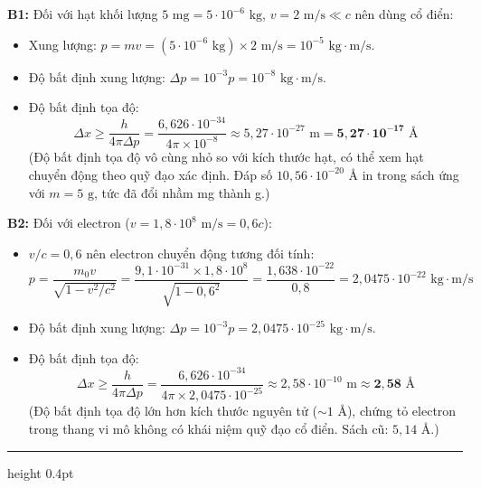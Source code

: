 \documentclass[11pt,a4paper]{article}
\renewcommand{\boldsymbol}[1]{\symbf{#1}}
\newcommand{\PhanCachBai}{%
  \par\Needspace{7\baselineskip}%
  \addvspace{6pt}%
  {\color{black!40}\hrule height 0.4pt}%
  \nobreak\vspace{7pt}\nobreak
}
\begin{document}
\textbf{B1:} Đối với hạt khối lượng $5\text{ mg}=5\cdot10^{-6}\text{ kg}$, $v=2\text{ m/s}\ll c$ nên dùng cổ điển:
\begin{itemize}[leftmargin=*, topsep=1pt, itemsep=1pt]
  \item Xung lượng: $p = m v = (5 \cdot 10^{-6}\text{ kg}) \times 2\text{ m/s} = 10^{-5}\text{ kg}\cdot\text{m/s}$.
  \item Độ bất định xung lượng: $\Delta p = 10^{-3} p = 10^{-8}\text{ kg}\cdot\text{m/s}$.
  \item Độ bất định tọa độ:
  \begin{equation*}
      \Delta x \ge \frac{h}{4\pi \Delta p} = \frac{6{,}626 \cdot 10^{-34}}{4\pi \times 10^{-8}} \approx 5{,}27 \cdot 10^{-27}\text{ m} = \boldsymbol{5{,}27 \cdot 10^{-17}\text{ \AA}}
  \end{equation*}
  (Độ bất định tọa độ vô cùng nhỏ so với kích thước hạt, có thể xem hạt chuyển động theo quỹ đạo xác định.
  Đáp số $10{,}56\cdot10^{-20}\text{ \AA}$ in trong sách ứng với $m=5\text{ g}$, tức đã đổi nhầm mg thành g.)
\end{itemize}

\textbf{B2:} Đối với electron ($v = 1{,}8 \cdot 10^8\text{ m/s} = 0{,}6c$):
\begin{itemize}[leftmargin=*, topsep=1pt, itemsep=1pt]
  \item $v/c=0{,}6$ nên electron chuyển động tương đối tính:
  \begin{equation*}
      p = \frac{m_0 v}{\sqrt{1 - v^2/c^2}} = \frac{9{,}1 \cdot 10^{-31} \times 1{,}8 \cdot 10^8}{\sqrt{1 - 0{,}6^2}} = \frac{1{,}638 \cdot 10^{-22}}{0{,}8} = 2{,}0475 \cdot 10^{-22}\text{ kg}\cdot\text{m/s}
  \end{equation*}
  \item Độ bất định xung lượng: $\Delta p = 10^{-3} p = 2{,}0475 \cdot 10^{-25}\text{ kg}\cdot\text{m/s}$.
  \item Độ bất định tọa độ:
  \begin{equation*}
      \Delta x \ge \frac{h}{4\pi \Delta p} = \frac{6{,}626 \cdot 10^{-34}}{4\pi \times 2{,}0475 \cdot 10^{-25}} \approx 2{,}58 \cdot 10^{-10}\text{ m} \approx \boldsymbol{2{,}58\text{ \AA}}
  \end{equation*}
  (Độ bất định tọa độ lớn hơn kích thước nguyên tử ($\sim 1\text{ \AA}$), chứng tỏ electron trong thang vi mô không có khái niệm quỹ đạo cổ điển. Sách cũ: $5{,}14\text{ \AA}$.)
\end{itemize}


\PhanCachBai
\end{document}
